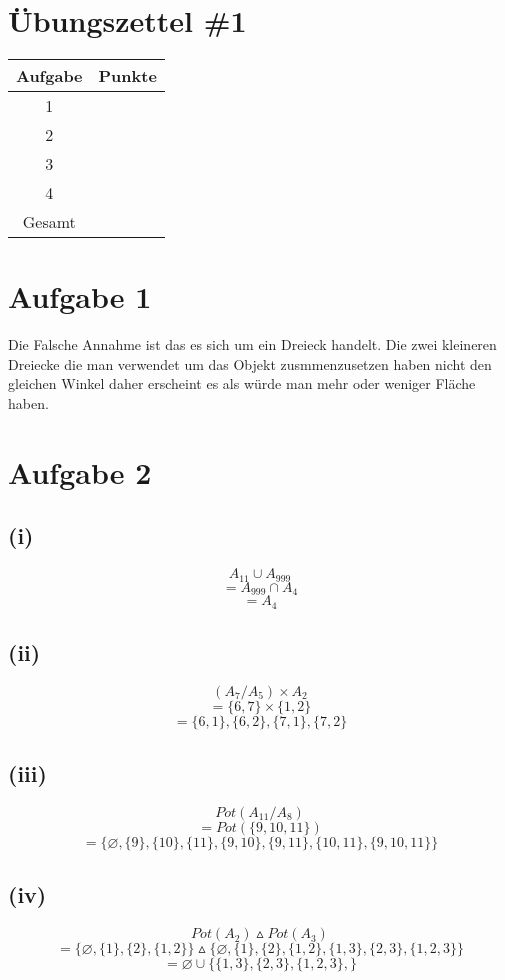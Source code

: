 \documentclass{article}
\begin{document}
\section*{Übungszettel \#1} %

\begin{center}
    \begin{tabular}{|c|c|}
        \hline
        Aufgabe & Punkte \\
        \hline
        1 & \\
        2 & \\
        3 & \\
        4 & \\
        \hline
        Gesamt & \\
        \hline
    \end{tabular}
\end{center}

\section*{Aufgabe 1}

Die Falsche Annahme ist das es sich um ein Dreieck handelt. Die zwei kleineren Dreiecke die man verwendet um das Objekt zusmmenzusetzen haben nicht den gleichen Winkel daher erscheint es als würde man mehr oder weniger Fläche haben. 

\section*{Aufgabe 2}
    \subsection*{(i)}
        \[A_{11} \cup A_{999}\] 
        \[= A_{999} \cap A_{4}\] 
        \[=A_{4}\]
    \subsection*{(ii)}
        \[(A_7 / A_5) \times A_2\]
        \[=\{6, 7\} \times \{1, 2\}\]
        \[=\{6, 1\}, \{6, 2\}, \{7, 1\}, \{7, 2\}\]
    \subsection*{(iii)}
        \[Pot(A_{11} / A_{8})\]
        \[= Pot(\{9, 10, 11\})\]
        \[=\{\varnothing, \{9\}, \{10\}, \{11\}, \{9, 10\}, \{9,11\}, \{10, 11\}, \{9, 10, 11\}\} \]
    \subsection*{(iv)}
        \[Pot(A_2) \vartriangle Pot(A_3)\]
        \[= \{\varnothing, \{1\}, \{2\}, \{1,2\}\}\vartriangle  \{\varnothing, \{1\}, \{2\}, \{1,2\}, \{1, 3\}, \{2,3\}, \{1, 2, 3\}\}\]
        \[=\varnothing \cup \{\{1, 3\}, \{2, 3\}, \{1, 2, 3 \}, \}\]
\end{document}
